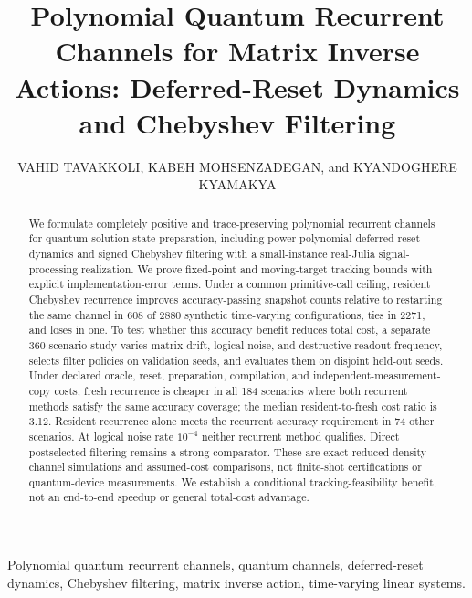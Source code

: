 \documentclass{ieeeaccess}
\begin{document}
\doi{}
\title{Polynomial Quantum Recurrent Channels for Matrix Inverse Actions: Deferred-Reset Dynamics and Chebyshev Filtering}
\author{\uppercase{Vahid Tavakkoli}, \uppercase{Kabeh Mohsenzadegan}, and \uppercase{Kyandoghere Kyamakya}}
\address[1]{Institute for Smart System Technologies, University of Klagenfurt, Klagenfurt, Austria}
\address[2]{Facult\'e Polytechnique, Universit\'e de Kinshasa, Kinshasa, Democratic Republic of the Congo}
\begin{abstract}
We formulate completely positive and trace-preserving polynomial recurrent channels for quantum solution-state preparation, including power-polynomial deferred-reset dynamics and signed Chebyshev filtering with a small-instance real-Julia signal-processing realization. We prove fixed-point and moving-target tracking bounds with explicit implementation-error terms. Under a common primitive-call ceiling, resident Chebyshev recurrence improves accuracy-passing snapshot counts relative to restarting the same channel in 608 of 2880 synthetic time-varying configurations, ties in 2271, and loses in one. To test whether this accuracy benefit reduces total cost, a separate 360-scenario study varies matrix drift, logical noise, and destructive-readout frequency, selects filter policies on validation seeds, and evaluates them on disjoint held-out seeds. Under declared oracle, reset, preparation, compilation, and independent-measurement-copy costs, fresh recurrence is cheaper in all 184 scenarios where both recurrent methods satisfy the same accuracy coverage; the median resident-to-fresh cost ratio is 3.12. Resident recurrence alone meets the recurrent accuracy requirement in 74 other scenarios. At logical noise rate $10^{-4}$ neither recurrent method qualifies. Direct postselected filtering remains a strong comparator. These are exact reduced-density-channel simulations and assumed-cost comparisons, not finite-shot certifications or quantum-device measurements. We establish a conditional tracking-feasibility benefit, not an end-to-end speedup or general total-cost advantage.
\end{abstract}
\begin{keywords}Polynomial quantum recurrent channels, quantum channels, deferred-reset dynamics, Chebyshev filtering, matrix inverse action, time-varying linear systems.\end{keywords}
\titlepgskip=-14pt\maketitle
\end{document}
